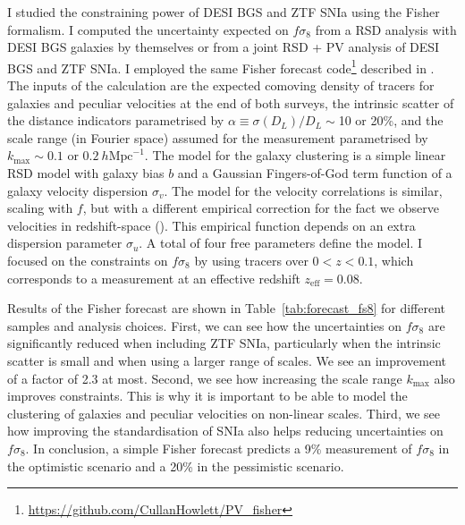 I studied the constraining power of DESI BGS and ZTF SNIa using the Fisher formalism.
I computed the uncertainty expected on $f\sigma_8$ from a RSD analysis with DESI BGS galaxies by themselves  
or from a joint RSD + PV analysis of DESI BGS and ZTF SNIa. 
I employed the same Fisher forecast code\footnote{\url{https://github.com/CullanHowlett/PV_fisher}} 
described in \cite{howlettMeasuringGrowthRate2017}. 
The inputs of the calculation are the expected comoving density of tracers for galaxies and peculiar velocities
at the end of both surveys, 
the intrinsic scatter of the distance indicators parametrised by $\alpha \equiv \sigma(D_L)/D_L \sim $10 or 20\%, 
and the scale range (in Fourier space) assumed for the measurement parametrised by $k_\text{max} \sim 0.1$ or $0.2~h\text{Mpc}^{-1}$. 
The model for the galaxy clustering is a simple linear RSD model with galaxy bias $b$ and 
a Gaussian Fingers-of-God term function of a galaxy velocity dispersion $\sigma_v$. 
The model for the velocity correlations is similar, scaling with $f$, but with a different 
empirical correction for the fact we observe velocities in redshift-space  (\cite{kodaArePeculiarVelocity2014}).
This empirical function depends on an extra dispersion parameter $\sigma_u$. 
A total of four free parameters define the model. I focused on the constraints on $f\sigma_8$ 
by using tracers over $0< z < 0.1$, which corresponds to a measurement at an effective 
redshift $z_\text{eff} = 0.08$. 

Results of the Fisher forecast are shown in Table~\ref{tab:forecast_fs8}
for different samples and analysis choices. 
First, we can see how the uncertainties on $f\sigma_8$ are 
significantly reduced when including ZTF SNIa, particularly when 
the intrinsic scatter is small and when using a larger range of scales. 
We see an improvement of a factor of 2.3 at most.  
Second, we see how increasing the scale range $k_\text{max}$ also improves constraints. 
This is why it is important to be able to model the clustering of galaxies and 
peculiar velocities on non-linear scales. 
Third, we see how improving the standardisation of SNIa also helps 
reducing uncertainties on $f\sigma_8$. 
In conclusion, a simple Fisher forecast predicts a 9\% measurement of $f\sigma_8$ 
in the optimistic scenario and a 20\% in the pessimistic scenario. 

